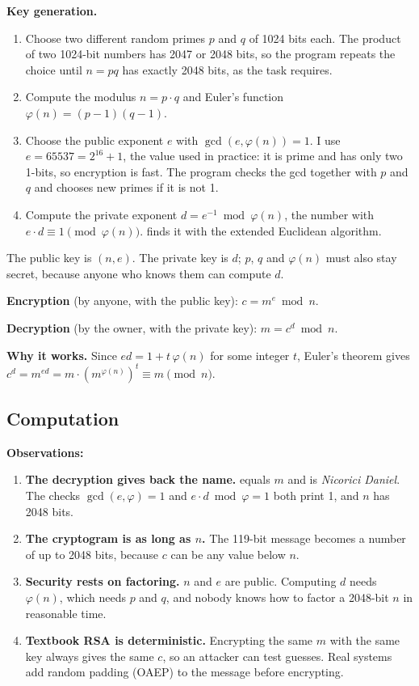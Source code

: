 \documentclass[11pt,a4paper]{article}
\begin{document}
\textbf{Key generation.}
\begin{enumerate}
  \item Choose two different random primes $p$ and $q$ of 1024 bits each. The product of two
  1024-bit numbers has 2047 or 2048 bits, so the program repeats the choice until $n = pq$ has
  exactly 2048 bits, as the task requires.
  \item Compute the modulus $n = p \cdot q$ and Euler's function $\varphi(n) = (p - 1)(q - 1)$.
  \item Choose the public exponent $e$ with $\gcd(e, \varphi(n)) = 1$. I use $e = 65537 = 2^{16} + 1$,
  the value used in practice: it is prime and has only two 1-bits, so encryption is fast. The
  program checks the gcd together with $p$ and $q$ and chooses new primes if it is not 1.
  \item Compute the private exponent $d = e^{-1} \bmod \varphi(n)$, the number with
  $e \cdot d \equiv 1 \pmod{\varphi(n)}$.  finds it with the extended
  Euclidean algorithm.
\end{enumerate}
The public key is $(n, e)$. The private key is $d$; $p$, $q$ and $\varphi(n)$ must also stay
secret, because anyone who knows them can compute $d$.

\textbf{Encryption} (by anyone, with the public key): $c = m^{e} \bmod n$.

\textbf{Decryption} (by the owner, with the private key): $m = c^{d} \bmod n$.

\textbf{Why it works.} Since $e d = 1 + t\,\varphi(n)$ for some integer $t$, Euler's theorem gives
$c^{d} = m^{e d} = m \cdot (m^{\varphi(n)})^{t} \equiv m \pmod{n}$.

\subsection{Computation}




\textbf{Observations:}
\begin{enumerate}
  \item \textbf{The decryption gives back the name.}  equals $m$ and
   is \textit{Nicorici Daniel}. The checks $\gcd(e, \varphi) = 1$ and
  $e \cdot d \bmod \varphi = 1$ both print 1, and $n$ has 2048 bits.
  \item \textbf{The cryptogram is as long as $n$.} The 119-bit message becomes a number of up to
  2048 bits, because $c$ can be any value below $n$.
  \item \textbf{Security rests on factoring.} $n$ and $e$ are public. Computing $d$ needs
  $\varphi(n)$, which needs $p$ and $q$, and nobody knows how to factor a 2048-bit $n$ in reasonable
  time.
  \item \textbf{Textbook RSA is deterministic.} Encrypting the same $m$ with the same key always
  gives the same $c$, so an attacker can test guesses. Real systems add random padding (OAEP) to
  the message before encrypting.
\end{enumerate}
\end{document}
